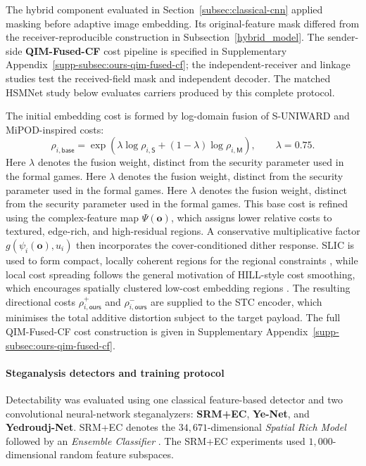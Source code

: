 \documentclass[pdflatex,sn-mathphys-num]{sn-jnl}%
\theoremstyle{definition}
\theoremstyle{game}
\theoremstyle{thmstyleone}%
\theoremstyle{thmstyletwo}%
\theoremstyle{thmstylethree}%
\begin{document}
The hybrid component evaluated in Section~\ref{subsec:classical-cnn}
applied masking before adaptive image
embedding. Its original-feature mask differed from the receiver-reproducible
construction in Subsection~\ref{hybrid_model}. The sender-side
\textbf{QIM-Fused-CF} cost pipeline is specified in Supplementary
Appendix~\ref{supp-subsec:ours-qim-fused-cf}; the independent-receiver and linkage studies
test the received-field mask and independent decoder. The matched HSMNet
study below evaluates carriers produced by this complete protocol.

The initial embedding cost is formed by log-domain fusion of
S-UNIWARD and MiPOD-inspired costs:
\[
    \rho_{i,\mathsf{base}}
    =
    \exp\!\left(
        \lambda\log\rho_{i,\mathsf{S}}
        +(1-\lambda)\log\rho_{i,\mathsf{M}}
    \right),
    \qquad \lambda=0.75.
\]
Here $\lambda$ denotes the fusion weight, distinct from the security
parameter used in the formal games. Here $\lambda$ denotes the fusion weight, distinct from the security
parameter used in the formal games. Here $\lambda$ denotes the fusion weight, distinct from the security
parameter used in the formal games. This base cost is refined using the complex-feature map
$\Psi(\mathbf{o})$, which assigns lower relative costs to textured, edge-rich, and high-residual regions. A conservative multiplicative factor $g(\psi_i(\mathbf{o}),u_i)$ then incorporates the cover-conditioned dither response. SLIC is used to form compact, locally coherent regions for the regional constraints \cite{achanta2012slic}, while local cost spreading follows the general motivation of HILL-style cost smoothing, which encourages spatially clustered low-cost embedding regions \cite{li2014new}. The resulting directional costs $\rho_{i,\mathsf{ours}}^{+}$ and $\rho_{i,\mathsf{ours}}^{-}$ are supplied to the STC encoder, which minimises the total additive distortion subject to the target payload. The full QIM-Fused-CF cost construction is given in Supplementary Appendix~\ref{supp-subsec:ours-qim-fused-cf}.


\paragraph{Steganalysis detectors and training protocol}
Detectability was evaluated using one classical feature-based
detector and two convolutional neural-network steganalyzers:
\textbf{SRM+EC}, \textbf{Ye-Net}, and
\textbf{Yedroudj-Net}. SRM+EC denotes the
$34{,}671$-dimensional \emph{Spatial Rich Model} followed by an
\emph{Ensemble Classifier}
\cite{Kodovsky2012Ensemble}. The SRM+EC experiments used $1{,}000$-dimensional random feature
subspaces. %
\end{document}
